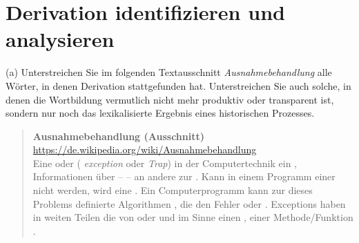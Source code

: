 \section{Derivation identifizieren und analysieren}

(a) Unterstreichen Sie im folgenden Textausschnitt \textit{Ausnahmebehandlung} alle Wörter, in denen Derivation stattgefunden hat.
Unterstreichen Sie auch solche, in denen die Wortbildung vermutlich nicht mehr produktiv oder transparent ist, sondern nur noch das lexikalisierte Ergebnis eines historischen Prozesses.

 \begin{quote}\onehalfspacing
   \textbf{Ausnahmebehandlung (Ausschnitt)}\\
   {\footnotesize\url{https://de.wikipedia.org/wiki/Ausnahmebehandlung}}\\

   Eine  oder  ( \textit{exception} oder \textit{Trap})  in der Computertechnik ein , Informationen über   –   – an andere  zur  .
Kann in einem Programm  einer  nicht  werden, wird eine  . Ein Computerprogramm kann zur  dieses Problems  definierte Algorithmen , die den Fehler  oder .
Exceptions haben in weiten Teilen die  von    oder   und  im  Sinne einen ,   einer Methode\slash Funktion .
 \end{quote}

